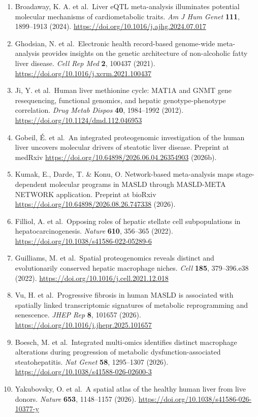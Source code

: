 \begin{enumerate}
\item
  Broadaway, K. A. et al.~Liver eQTL meta-analysis illuminates potential molecular mechanisms of cardiometabolic traits. \emph{Am J Hum Genet} \textbf{111}, 1899--1913 (2024). \url{https://doi.org/10.1016/j.ajhg.2024.07.017}
\item
  Ghodsian, N. et al.~Electronic health record-based genome-wide meta-analysis provides insights on the genetic architecture of non-alcoholic fatty liver disease. \emph{Cell Rep Med} \textbf{2}, 100437 (2021). \url{https://doi.org/10.1016/j.xcrm.2021.100437}
\item
  Ji, Y. et al.~Human liver methionine cycle: MAT1A and GNMT gene resequencing, functional genomics, and hepatic genotype-phenotype correlation. \emph{Drug Metab Dispos} \textbf{40}, 1984--1992 (2012). \url{https://doi.org/10.1124/dmd.112.046953}
\item
  Gobeil, É. et al.~An integrated proteogenomic investigation of the human liver uncovers molecular drivers of steatotic liver disease. Preprint at medRxiv \url{https://doi.org/10.64898/2026.06.04.26354903} (2026b).
\item
  Kumak, E., Darde, T. \& Konu, O. Network-based meta-analysis maps stage-dependent molecular programs in MASLD through MASLD-META NETWORK application. Preprint at bioRxiv \url{https://doi.org/10.64898/2026.08.26.747338} (2026).
\item
  Filliol, A. et al.~Opposing roles of hepatic stellate cell subpopulations in hepatocarcinogenesis. \emph{Nature} \textbf{610}, 356--365 (2022). \url{https://doi.org/10.1038/s41586-022-05289-6}
\item
  Guilliams, M. et al.~Spatial proteogenomics reveals distinct and evolutionarily conserved hepatic macrophage niches. \emph{Cell} \textbf{185}, 379--396.e38 (2022). \url{https://doi.org/10.1016/j.cell.2021.12.018}
\item
  Vu, H. et al.~Progressive fibrosis in human MASLD is associated with spatially linked transcriptomic signatures of metabolic reprogramming and senescence. \emph{JHEP Rep} \textbf{8}, 101657 (2026). \url{https://doi.org/10.1016/j.jhepr.2025.101657}
\item
  Boesch, M. et al.~Integrated multi-omics identifies distinct macrophage alterations during progression of metabolic dysfunction-associated steatohepatitis. \emph{Nat Genet} \textbf{58}, 1295--1307 (2026). \url{https://doi.org/10.1038/s41588-026-02600-3}
\item
  Yakubovsky, O. et al.~A spatial atlas of the healthy human liver from live donors. \emph{Nature} \textbf{653}, 1148--1157 (2026). \url{https://doi.org/10.1038/s41586-026-10377-y}

\end{enumerate}
